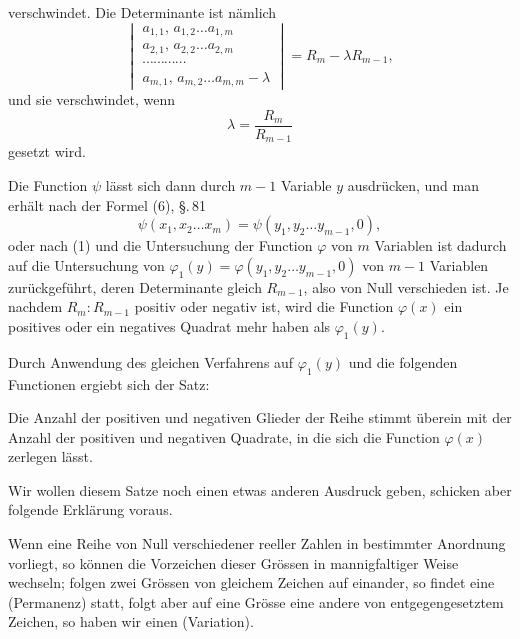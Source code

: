 
verschwindet. Die Determinante ist nämlich
\[
\begin{vmatrix}
a_{1,1},\, a_{1,2} \ldots a_{1,m} \\
a_{2,1},\, a_{2,2} \ldots a_{2,m} \\
\cdots\cdots\cdots\cdots \\
a_{m,1},\, a_{m,2} \ldots a_{m,m} - \lambda
\end{vmatrix}
= R_m - \lambda R_{m-1},
\]
und sie verschwindet, wenn
\[
\lambda = \frac{R_m}{R_{m-1}}
\]
gesetzt wird.

Die Function $\psi$ lässt sich dann durch $m-1$ Variable $y$ ausdrücken, und man erhält nach der Formel (6), \S.\,81
\[
\psi(x_1, x_2 \ldots x_m) = \psi(y_1, y_2 \ldots y_{m-1}, 0),
\]
oder nach (1)
und die Untersuchung der Function $\varphi$ von $m$ Variablen ist dadurch auf die Untersuchung von $\varphi_1(y) = \varphi(y_1, y_2 \ldots y_{m-1}, 0)$ von $m-1$ Variablen zurückgeführt, deren Determinante gleich $R_{m-1}$, also von Null verschieden ist. Je nachdem $R_m : R_{m-1}$ positiv oder negativ ist, wird die Function $\varphi(x)$ ein positives oder ein negatives Quadrat mehr haben als $\varphi_1(y)$.

Durch Anwendung des gleichen Verfahrens auf $\varphi_1(y)$ und die folgenden Functionen ergiebt sich der Satz:

Die Anzahl der positiven und negativen Glieder der Reihe
stimmt überein mit der Anzahl der positiven und negativen Quadrate, in die sich die Function $\varphi(x)$ zerlegen lässt.

Wir wollen diesem Satze noch einen etwas anderen Ausdruck geben, schicken aber folgende Erklärung voraus.

Wenn eine Reihe von Null verschiedener reeller Zahlen in bestimmter Anordnung vorliegt, so können die Vorzeichen dieser Grössen in mannigfaltiger Weise wechseln; folgen zwei Grössen von gleichem Zeichen auf einander, so findet eine  (Permanenz) statt, folgt aber auf eine Grösse eine andere von entgegengesetztem Zeichen, so haben wir einen  (Variation).
